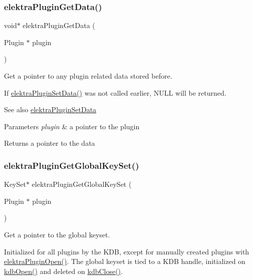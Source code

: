 \subsubsection{\texorpdfstring{elektraPluginGetData()}{elektraPluginGetData()}}
{\footnotesize\ttfamily void$\ast$ elektra\+Plugin\+Get\+Data (\begin{DoxyParamCaption}\item[{Plugin $\ast$}]{plugin }\end{DoxyParamCaption})}



Get a pointer to any plugin related data stored before. 

If \mbox{\hyperlink{group__plugin_gaf4b941a52ff55d0ca2a9158d90208ef2}{elektra\+Plugin\+Set\+Data()}} was not called earlier, N\+U\+LL will be returned.

\begin{DoxySeeAlso}{See also}
\mbox{\hyperlink{group__plugin_gaf4b941a52ff55d0ca2a9158d90208ef2}{elektra\+Plugin\+Set\+Data}} 
\end{DoxySeeAlso}

\begin{DoxyParams}{Parameters}
{\em plugin} & a pointer to the plugin \\
\hline
\end{DoxyParams}
\begin{DoxyReturn}{Returns}
a pointer to the data 
\end{DoxyReturn}
\mbox{\label{group__plugin_ga436cda13ed70c0face08661a90620bf6}} 
\subsubsection{\texorpdfstring{elektraPluginGetGlobalKeySet()}{elektraPluginGetGlobalKeySet()}}
{\footnotesize\ttfamily Key\+Set$\ast$ elektra\+Plugin\+Get\+Global\+Key\+Set (\begin{DoxyParamCaption}\item[{Plugin $\ast$}]{plugin }\end{DoxyParamCaption})}



Get a pointer to the global keyset. 

Initialized for all plugins by the K\+DB, except for manually created plugins with {\ttfamily \mbox{\hyperlink{elektra_2plugin_8c_a32a70a7876542c51d153164ac5108a57}{elektra\+Plugin\+Open()}}}. The global keyset is tied to a K\+DB handle, initialized on {\ttfamily \mbox{\hyperlink{group__kdb_ga6808defe5870f328dd17910aacbdc6ca}{kdb\+Open()}}} and deleted on {\ttfamily \mbox{\hyperlink{group__kdb_gadb54dc9fda17ee07deb9444df745c96f}{kdb\+Close()}}}.


